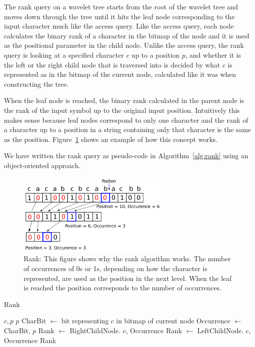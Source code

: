The rank query on a wavelet tree starts from the root of the wavelet tree and moves down through the tree until it hits the leaf node corresponding to the input character much like the access query.
Like the access query, each node calculates the binary rank of a character in the bitmap of the node and it is used as the positional parameter in the child node.
Unlike the access query, the rank query is looking at a specified character $c$ up to a position $p$, and whether it is the left or the right child node that is traversed into is decided by what $c$ is represented as in the bitmap of the current node, calculated like it was when constructing the tree.

When the leaf node is reached, the binary rank calculated in the parent node is the rank of the input symbol up to the original input position.
Intuitively this makes sense because leaf nodes correspond to only one character and the rank of a character up to a position in a string containing only that character is the same as the position.
Figure~\ref{fig:RankDrawing} shows an example of how this concept works.

We have written the rank query as pseudo-code in Algorithm~\ref{alg:rank} using an object-oriented approach.

\begin{figure}
\center \includegraphics[width=0.66\textwidth]{RankDrawing}
\caption{Rank: This figure shows why the rank algorithm works. The number of occurrences of 0s or 1s, depending on how the character is represented, are used as the position in the next level. 
When the leaf is reached the position corresponds to the number of occurrences.}
\label{fig:RankDrawing}
\end{figure}

\begin{algorithm}
\caption{Rank}
\label{alg:rank}
\begin{algorithmic} 
 {$c, p$}
\State \Return $p$
\EndIf
\State CharBit $\gets$ bit representing $c$ in bitmap of current node
\State Occurrence $\gets$  {CharBit, $p$}
	\State Rank $\gets$ RightChildNode. {$c$, Occurrence}
\Else
	\State Rank $\gets$ LeftChildNode. {$c$, Occurrence}
\EndIf
\State \Return Rank
\EndFunction
\end{algorithmic}
\end{algorithm}


